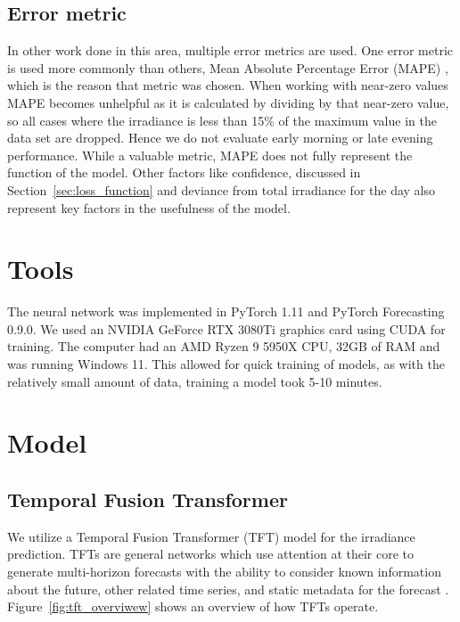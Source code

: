 \subsection{Error metric}
In other work done in this area, multiple error metrics are used. One error metric is used more commonly than others, Mean Absolute Percentage Error (MAPE) \cite{lin_temporal_2020, lee_forecasting_2018, jaidee_very_2019, su_machine_2019}, which is the reason that metric was chosen.
When working with near-zero values MAPE becomes unhelpful as it is calculated by dividing by that near-zero value, so all cases where the irradiance is less than 15\% of the maximum value in the data set are dropped. Hence we do not evaluate early morning or late evening performance.
While a valuable metric, MAPE does not  fully represent the function of the model. Other factors like confidence, discussed in Section~\ref{sec:loss_function} and deviance from total irradiance for the day also represent key factors in the usefulness of the model.




\section{Tools}
The neural network was implemented in PyTorch 1.11 and PyTorch Forecasting 0.9.0. We used an NVIDIA GeForce RTX 3080Ti graphics card using CUDA for training. The computer had an AMD Ryzen 9 5950X CPU, 32GB of RAM and was running Windows 11.
This allowed for quick training of models, as with the relatively small amount of data, training a model took 5-10 minutes.

\newpage

\section{Model}
    \subsection{Temporal Fusion Transformer}
    
    \noindent We utilize a Temporal Fusion Transformer (TFT) model for the irradiance prediction.
    TFTs are  general networks which use attention at their core to generate multi-horizon forecasts with the ability to consider
    known information about the future, other related time series, and static metadata for the forecast \cite{lim_temporal_2020}. Figure~\ref{fig:tft_overviwew} shows an overview of how TFTs operate.
    
